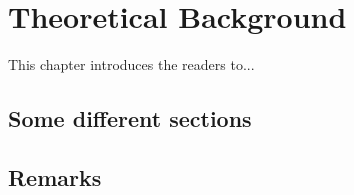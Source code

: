 \chapter{Theoretical Background}
\label{chap:TheoreticalBackground}
\thispagestyle{empty}

\vspace{0.5cm}

\noindent This chapter introduces the readers to...

\section{Some different sections}

\section{Remarks}
